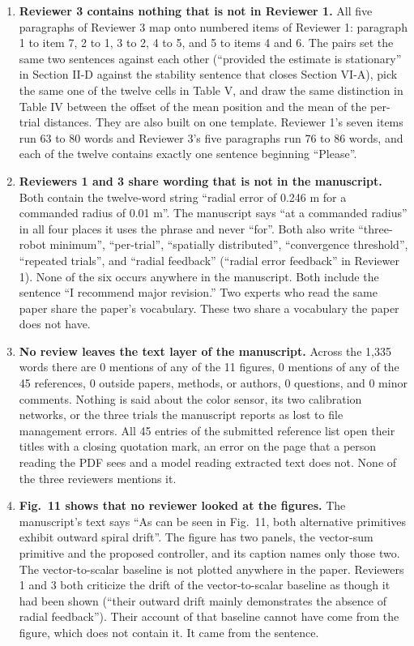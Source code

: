 \documentclass[11pt,letterpaper]{article}
\newcommand{\q}[1]{``#1''}
\newcommand{\head}[1]{\vspace{6pt}{\sffamily\bfseries\small\textcolor{accent}{\MakeUppercase{#1}}}\par\vspace{1pt}{\color{rule}\hrule height 0.6pt}\vspace{4pt}}
\newcommand{\lead}[1]{\textbf{#1}}
\begin{document}
\head{The reviewing was done by the model}
\begin{enumerate}[resume]

\item \lead{Reviewer 3 contains nothing that is not in Reviewer 1.} All five paragraphs of Reviewer 3 map onto numbered items of Reviewer 1: paragraph 1 to item 7, 2 to 1, 3 to 2, 4 to 5, and 5 to items 4 and 6. The pairs set the same two sentences against each other (\q{provided the estimate is stationary} in Section II-D against the stability sentence that closes Section VI-A), pick the same one of the twelve cells in Table V, and draw the same distinction in Table IV between the offset of the mean position and the mean of the per-trial distances. They are also built on one template. Reviewer 1's seven items run 63 to 80 words and Reviewer 3's five paragraphs run 76 to 86 words, and each of the twelve contains exactly one sentence beginning \q{Please}.

\item \lead{Reviewers 1 and 3 share wording that is not in the manuscript.} Both contain the twelve-word string \q{radial error of 0.246 m for a commanded radius of 0.01 m}. The manuscript says \q{at a commanded radius} in all four places it uses the phrase and never \q{for}. Both also write \q{three-robot minimum}, \q{per-trial}, \q{spatially distributed}, \q{convergence threshold}, \q{repeated trials}, and \q{radial feedback} (\q{radial error feedback} in Reviewer 1). None of the six occurs anywhere in the manuscript. Both include the sentence \q{I recommend major revision.} Two experts who read the same paper share the paper's vocabulary. These two share a vocabulary the paper does not have.

\item \lead{No review leaves the text layer of the manuscript.} Across the 1,335 words there are 0 mentions of any of the 11 figures, 0 mentions of any of the 45 references, 0 outside papers, methods, or authors, 0 questions, and 0 minor comments. Nothing is said about the color sensor, its two calibration networks, or the three trials the manuscript reports as lost to file management errors. All 45 entries of the submitted reference list open their titles with a closing quotation mark, an error on the page that a person reading the PDF sees and a model reading extracted text does not. None of the three reviewers mentions it.

\item \lead{Fig.~11 shows that no reviewer looked at the figures.} The manuscript's text says \q{As can be seen in Fig.~11, both alternative primitives exhibit outward spiral drift}. The figure has two panels, the vector-sum primitive and the proposed controller, and its caption names only those two. The vector-to-scalar baseline is not plotted anywhere in the paper. Reviewers 1 and 3 both criticize the drift of the vector-to-scalar baseline as though it had been shown (\q{their outward drift mainly demonstrates the absence of radial feedback}). Their account of that baseline cannot have come from the figure, which does not contain it. It came from the sentence.


\end{enumerate}
\end{document}
